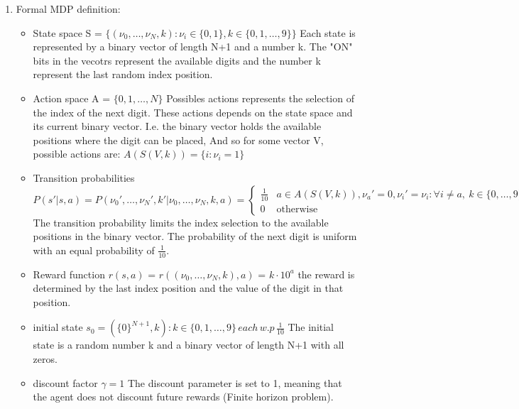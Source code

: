 \documentclass{assignmeownt}
\begin{document}
\begin{enumerate} %
\item Formal MDP definition:
\newline
\begin{itemize} %

\item State space
S = $\{(\nu_0, \dots, \nu_{N}, k) : \nu_i \in \{0, 1\}, k \in \{0, 1,  \dots, 9\}\}$
\newline
Each state is represented by a binary vector of length N+1 and a number k. The "ON" bits in the vecotrs represent the available digits and the number k represent the last random index position.
\newline

\item Action space
A = $\{0, 1, \dots, N\}$
\newline
Possibles actions represents the selection of the index of the next digit. These actions depends on the state space and its current binary vector.
\newline
I.e. the binary vector holds the available positions where the digit can be placed, And so for some vector V, possible actions are: $A(S(V, k)) = \{i : \nu_i = 1\}$

\item Transition probabilities
\newline
$$
P(s' | s, a) = P(\nu_0', \dots, \nu_{N}', k' | \nu_0, \dots, \nu_{N}, k, a) = 
\begin{cases} 
\frac{1}{10} &  a \in A(S(V, k)), \nu_{a}'=0, \nu_{i}'=\nu_{i} : \forall{i}\neq{a},\ k \in\{0, \dots, 9\}   \\
0 & \text{otherwise}
\end{cases}
$$
\newline
The transition probability limits the index selection to the available positions in the binary vector. The probability of the next digit is uniform with an equal probability of $\frac{1}{10}$.

\item Reward function $r(s, a)$ = $r((\nu_0, \dots, \nu_{N}, k), a)$ = $ k \cdot{10^a} $
\newline
the reward is determined by the last index position and the value of the digit in that position.

\item initial state $s_0 = (\{0\}^{N+1}, k): k \in \{0, 1, \dots, 9\} \, each \, w.p \, \frac{1}{10}$
\newline
The initial state is a random number k and a binary vector of length N+1 with all zeros.
\item discount factor $\gamma = 1$
\newline
The discount parameter is set to 1, meaning that the agent does not discount future rewards (Finite horizon problem).


\end{itemize}
\end{enumerate}
\end{document}
